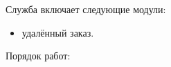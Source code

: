 Служба включает следующие модули:
\begin{itemize} %
  \item удалённый заказ.
\end{itemize}

Порядок работ:

\begin{enumerate} %
\end{enumerate}
